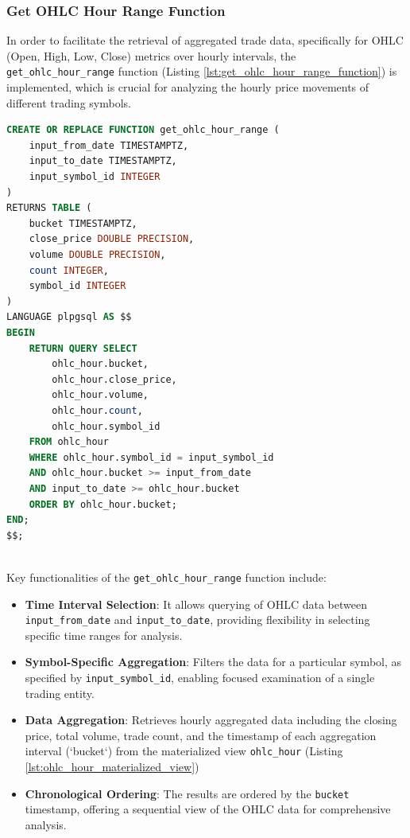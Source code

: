 \subsubsection{Get OHLC Hour Range Function}
In order to facilitate the retrieval of aggregated trade data, specifically for OHLC (Open, High, Low, Close) metrics over hourly intervals, the \texttt{get\_ohlc\_hour\_range} function (Listing \ref{lst:get_ohlc_hour_range_function}) is implemented, which is crucial for analyzing the hourly price movements of different trading symbols.
\begin{lstlisting}[language=SQL, caption={Function for Retrieving Hourly OHLC Data}, label={lst:get_ohlc_hour_range_function}]
CREATE OR REPLACE FUNCTION get_ohlc_hour_range (
    input_from_date TIMESTAMPTZ,
    input_to_date TIMESTAMPTZ,
    input_symbol_id INTEGER 
)
RETURNS TABLE (
    bucket TIMESTAMPTZ,
    close_price DOUBLE PRECISION,
    volume DOUBLE PRECISION,
    count INTEGER, 
    symbol_id INTEGER
)
LANGUAGE plpgsql AS $$
BEGIN
    RETURN QUERY SELECT 
        ohlc_hour.bucket,
        ohlc_hour.close_price,
        ohlc_hour.volume,
        ohlc_hour.count,
        ohlc_hour.symbol_id
    FROM ohlc_hour
    WHERE ohlc_hour.symbol_id = input_symbol_id
    AND ohlc_hour.bucket >= input_from_date  
    AND input_to_date >= ohlc_hour.bucket 
    ORDER BY ohlc_hour.bucket; 
END;
$$;
\end{lstlisting}
\mbox{} \\
Key functionalities of the \texttt{get\_ohlc\_hour\_range} function include:
\begin{itemize}
    \item \textbf{Time Interval Selection}: It allows querying of OHLC data between \texttt{input\_from\_date} and \texttt{input\_to\_date}, providing flexibility in selecting specific time ranges for analysis.
    \item \textbf{Symbol-Specific Aggregation}: Filters the data for a particular symbol, as specified by \texttt{input\_symbol\_id}, enabling focused examination of a single trading entity.
    \item \textbf{Data Aggregation}: Retrieves hourly aggregated data including the closing price, total volume, trade count, and the timestamp of each aggregation interval (`bucket`) from the materialized view \texttt{ohlc\_hour} (Listing \ref{lst:ohlc_hour_materialized_view})
    \item \textbf{Chronological Ordering}: The results are ordered by the \texttt{bucket} timestamp, offering a sequential view of the OHLC data for comprehensive analysis.
\end{itemize}

